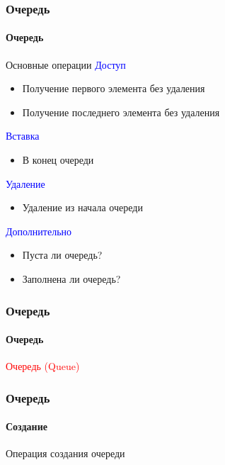 \documentclass[aspectratio=169]{beamer}
\begin{document}
\begin{frame}
\frametitle{Очередь}
\framesubtitle{Очередь}
Основные операции\newline\newline
\textcolor{blue}{Доступ}
\begin{itemize}
  \item{Получение первого элемента без удаления}
  \item{Получение последнего элемента без удаления}
\end{itemize}
\textcolor{blue}{Вставка}
\begin{itemize}
  \item{В конец очереди}
\end{itemize}
\textcolor{blue}{Удаление}
\begin{itemize}
  \item{Удаление из начала очереди}
\end{itemize}
\textcolor{blue}{Дополнительно}
\begin{itemize}
  \item{Пуста ли очередь?}
  \item{Заполнена ли очередь?}
\end{itemize}
\end{frame}

\begin{frame}
\frametitle{Очередь}
\framesubtitle{Очередь}
\justifying
\textcolor{red}{Очередь (Queue)}

\begin{figure}
    \captionsetup[subfigure]{labelformat=empty}
    \centering
\end{figure}
\end{frame}

\begin{frame}
\frametitle{Очередь}
\framesubtitle{Создание}
\justifying
Операция создания очереди

\begin{figure}
    \captionsetup[subfigure]{labelformat=empty}
    \centering
\end{figure}
\end{frame}
\end{document}
